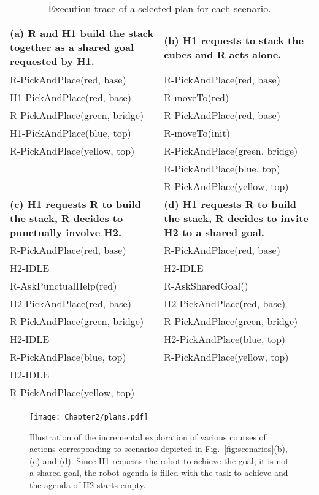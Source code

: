 \begin{table}
\small
\begin{tabularx}{0.98\textwidth}{|X||X|}
    \hline
    \textbf{(a) R and H1 build the stack together as a shared goal requested by H1.}     & \textbf{(b) H1 requests to stack the cubes and R acts alone.} \\
    \hline
    R-PickAndPlace(red, base)     & R-PickAndPlace(red, base) \\ 
    H1-PickAndPlace(red, base)     & R-moveTo(red) \\  
    R-PickAndPlace(green, bridge) & R-PickAndPlace(red, base) \\
    H1-PickAndPlace(blue, top)     & R-moveTo(init) \\
    R-PickAndPlace(yellow, top)   & R-PickAndPlace(green, bridge) \\
                                    & R-PickAndPlace(blue, top) \\
                                    & R-PickAndPlace(yellow, top) \\
    \hline \hline
    \textbf{(c) H1 requests R to build the stack, R decides to punctually involve H2.} & \textbf{(d) H1 requests R to build the stack, R decides to invite H2 to a shared goal.} \\
    \hline
    R-PickAndPlace(red, base)     & R-PickAndPlace(red, base) \\
    H2-IDLE                        & H2-IDLE \\
    R-AskPunctualHelp(red)        & R-AskSharedGoal() \\
    H2-PickAndPlace(red, base)     & H2-PickAndPlace(red, base) \\
    R-PickAndPlace(green, bridge) & R-PickAndPlace(green, bridge) \\
    H2-IDLE                        & H2-PickAndPlace(blue, top) \\
    R-PickAndPlace(blue, top)     & R-PickAndPlace(yellow, top) \\
    H2-IDLE                        & \\
    R-PickAndPlace(yellow, top)   & \\
    \hline
\end{tabularx}
\caption{Execution trace of a selected plan for each scenario.}
\label{tab:plans}
\end{table}

\begin{sidewaysfigure}
    \centering 
    \texttt{[image: Chapter2/plans.pdf]}
    \caption{Illustration of the incremental exploration of various courses of actions corresponding to scenarios depicted in Fig.~\ref{fig:scenarios}(b), (c) and (d). Since H1 requests the robot to achieve the goal, it is not a shared goal, the robot agenda is filled with the task to achieve and the agenda of H2 starts empty.}
    \label{fig:plans}
\end{sidewaysfigure}

